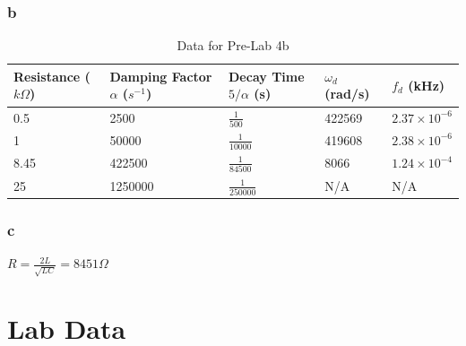 \documentclass[10pt]{article}
\begin{document}
\subsubsection*{b}
\begin{table}[H]
	\centering
	\begin{tabular}{lllll}
		\hline
		\textbf{Resistance} ($k\Omega$) & \textbf{Damping Factor} $\alpha$ ($s^{-1}$) & \textbf{Decay Time} $5/\alpha$ (s) & $\omega_d$ (rad/s) & $f_d$ (kHz)\\
		\hline
		0.5 & 2500 & $\frac{1}{500}$ & 422569 & $2.37\times10^{-6}$\\
		1 & 50000 & $\frac{1}{10000}$ & 419608 & $2.38\times10^{-6}$\\
		8.45 & 422500 & $\frac{1}{84500}$ & 8066 & $1.24\times10^{-4}$\\
		25 & 1250000 & $\frac{1}{250000}$ & N/A & N/A\\
		\hline
	\end{tabular}
	\caption{Data for Pre-Lab 4b}
\end{table}

\subsubsection*{c}
$R = \frac{2L}{\sqrt{LC}} = 8451\Omega$

\section*{Lab Data}
\end{document}
